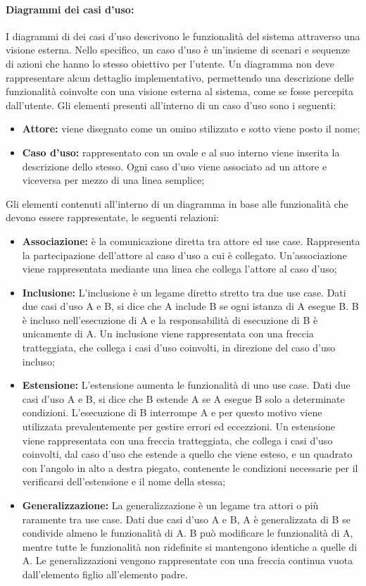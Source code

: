 \paragraph{Diagrammi dei casi d'uso:}\label{ProcessiPrimariProgettazioneUMLDiagrammiCasiUso}
I diagrammi di dei casi d'uso descrivono le funzionalità del sistema attraverso una visione esterna. Nello specifico, un caso d'uso è un'insieme di scenari e sequenze di azioni che hanno lo stesso obiettivo per l'utente. Un diagramma non deve rappresentare alcun dettaglio implementativo, permettendo una descrizione delle funzionalità coinvolte con una visione esterna al sistema, come se fosse percepita dall'utente. Gli elementi presenti all'interno di un caso d'uso sono i seguenti:
\begin{itemize}
	\item \textbf{Attore:} viene disegnato come un omino stilizzato e sotto viene posto il nome;
	\item \textbf{Caso d'uso:} rappresentato con un ovale e al suo interno viene inserita la descrizione dello stesso. Ogni caso d'uso viene associato ad un attore e viceversa per mezzo di una linea semplice;	
\end{itemize}
Gli elementi contenuti all'interno di un diagramma in base alle funzionalità che devono essere rappresentate, le seguenti relazioni:
\begin{itemize}
\item \textbf{Associazione:} è la comunicazione diretta tra attore ed use case. Rappresenta la partecipazione dell'attore al caso d'uso a cui è collegato. Un'associazione viene rappresentata mediante una linea che collega l'attore al caso d'uso;
\item \textbf{Inclusione:} L'inclusione è un legame diretto stretto tra due use case. Dati due casi d'uso A e B, si dice che A include B se ogni istanza di A esegue B. B è incluso nell'esecuzione di A e la responsabilità di esecuzione di B è unicamente di A. Un inclusione viene rappresentata con una freccia tratteggiata, che collega i casi d'uso coinvolti, in direzione del caso d'uso incluso;
\item \textbf{Estensione:} L'estensione aumenta le funzionalità di uno use case. Dati due casi d'uso A e B, si dice che B estende A se A esegue B solo a determinate condizioni. L'esecuzione di B interrompe A e per questo motivo viene utilizzata prevalentemente per gestire errori ed eccezzioni. Un estensione viene rappresentata con una freccia tratteggiata, che collega i casi d'uso coinvolti, dal caso d'uso che estende a quello che viene esteso, e un quadrato con l'angolo in alto a destra piegato, contenente le condizioni necessarie per il verificarsi dell'estensione e il nome della stessa;
\item \textbf{Generalizzazione:} La generalizzazione è un legame tra attori o più raramente tra use case. Dati due casi d'uso A e B, A è generalizzata di B se condivide almeno le funzionalità di A. B può modificare le funzionalità di A, mentre tutte le funzionalità non ridefinite si mantengono identiche a quelle di A. Le generalizzazioni vengono rappresentate con una freccia continua vuota dall'elemento figlio all'elemento padre.
\end{itemize}



